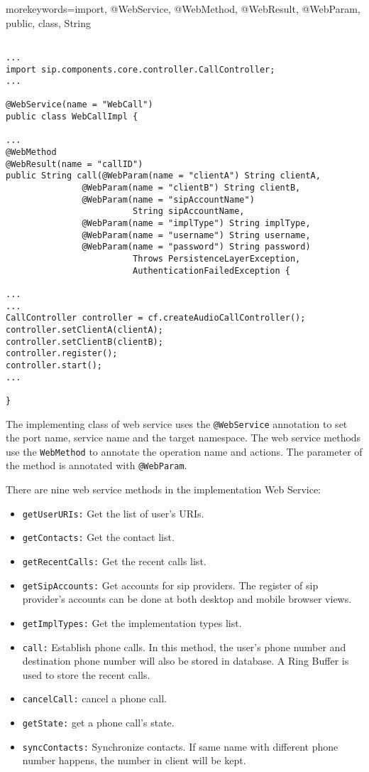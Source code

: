 {morekeywords={import, @WebService, @WebMethod, @WebResult, @WebParam, public, class, String}}
\lstset{language=Java}

\begin{lstlisting}[frame=lines, float=!bph, caption=Web Service implementation (fragment), label=WebServiceImplementation]

...
import sip.components.core.controller.CallController;
...

@WebService(name = "WebCall")
public class WebCallImpl {

...
@WebMethod
@WebResult(name = "callID")
public String call(@WebParam(name = "clientA") String clientA,
               @WebParam(name = "clientB") String clientB,
               @WebParam(name = "sipAccountName") 
                         String sipAccountName,
               @WebParam(name = "implType") String implType,
               @WebParam(name = "username") String username,
               @WebParam(name = "password") String password)
                         Throws PersistenceLayerException, 
                         AuthenticationFailedException {
                             
...
...
CallController controller = cf.createAudioCallController();
controller.setClientA(clientA);
controller.setClientB(clientB);
controller.register();
controller.start();
...

}
\end{lstlisting}


The implementing class of web service uses the \texttt{@WebService} annotation to set the port name, service name and the target namespace. The web service methods use the \texttt{WebMethod} to annotate the operation name and actions.  The parameter of the method is annotated with \texttt{@WebParam}.

There are nine web service methods in the implementation Web Service:
\begin{itemize}
\item \texttt{getUserURIs:} Get the list of user's URIs.
\item \texttt{getContacts:} Get the contact list.
\item \texttt{getRecentCalls:} Get the recent calls list.
\item \texttt{getSipAccounts:} Get accounts for sip providers. The register of sip provider's accounts can be done at both desktop and mobile browser views.
\item \texttt{getImplTypes:} Get the implementation types list.
\item \texttt{call:} Establish phone calls. In this method, the user's phone number and destination phone number will also be stored in database. A Ring Buffer is used to store the recent calls.
\item \texttt{cancelCall:} cancel a phone call.
\item \texttt{getState:} get a phone call's state.
\item \texttt{syncContacts:} Synchronize contacts.  If same name with different phone number happens, the number in client will be kept.

\end{itemize}

